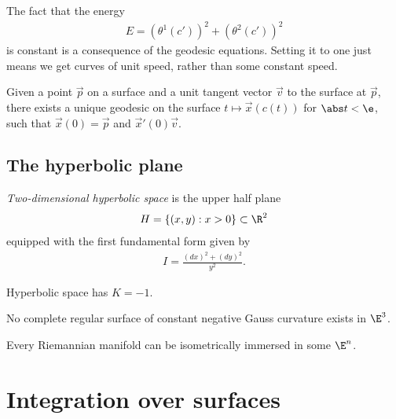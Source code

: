 \documentclass{article}
\begin{document}
\begin{proposition}
    The fact that the energy
    \begin{align*}
        E = (\theta^1(c'))^2 + (\theta^2(c'))^2
    \end{align*}
    is constant is a consequence of the geodesic equations. Setting it to one just means we get 
    curves of unit speed, rather than some constant speed.
\end{proposition}

\begin{proposition}
    Given a point $\vec p$ on a surface and a unit tangent vector $\vec v$ to the surface at $\vec p$,
    there exists a unique geodesic on the surface $t\mapsto \vec x(c(t))$ for $\abs t < \e$,
    such that $\vec x(0) =\vec p$ and $\vec x'(0) \vec v$.
\end{proposition}

\subsection{The hyperbolic plane}

\begin{definition}
    \emph{Two-dimensional hyperbolic space} is the upper half plane 
    \begin{align*}
        H = \{(x,y) : x > 0\}\subset\R^2
    \end{align*}
    equipped with the first fundamental form given by 
    \begin{align*}
        I = \frac{(dx)^2 + (dy)^2}{y^2}.
    \end{align*}
\end{definition}

\begin{theorem}
    Hyperbolic space has $K=-1$.    
\end{theorem}

\begin{theorem}[Hilbert]
    No complete regular surface of constant negative Gauss curvature exists in $\E^3$. 
\end{theorem}

\begin{theorem}[Nash]
    Every Riemannian manifold can be isometrically immersed in some $\E^n$. 
\end{theorem}

\section{Integration over surfaces}
\end{document}

